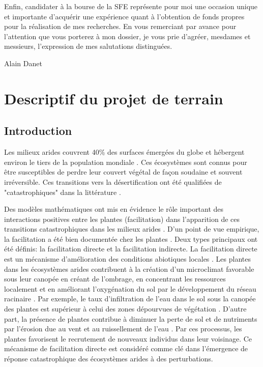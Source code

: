 \documentclass[12pt]{article} %
\begin{document}
Enfin, candidater à la bourse de la SFE représente pour moi une occasion unique et importante d’acquérir une expérience quant à l’obtention de fonds propres pour la réalisation de mes recherches. En vous remerciant par avance pour l’attention que vous porterez à mon dossier, je vous prie d’agréer, mesdames et messieurs, l’expression de mes salutations distinguées.

\begin{flushright}
Alain Danet
\end{flushright}
\clearpage

\section{Descriptif du projet de terrain}

\subsection{Introduction}

Les milieux arides couvrent 40\% des surfaces émergées du globe et hébergent environ le tiers de la population mondiale \citep{Assessment2005}. Ces écosystèmes sont connus pour être susceptibles de perdre leur couvert végétal de façon soudaine et souvent irréversible. Ces transitions vers la désertification ont été qualifiées de "catastrophiques" dans la littérature \citep{Scheffer2001,Kefi2007,Kefi2012a}.

Des modèles mathématiques ont mis en évidence le rôle important des interactions positives entre les plantes (facilitation) dans l'apparition de ces transitions catastrophiques dans les milieux arides \citep{Kefi2007,Kefi2007a,Rietkerk2004}. D'un point de vue empirique, la facilitation a été bien documentée chez les plantes \citep{Callaway1995, Callaway1997}. Deux types principaux ont été définis: la facilitation directe et la facilitation indirecte. La facilitation directe est un mécanisme d'amélioration des conditions abiotiques locales \citep{Kefi2007a}. Les plantes dans les écosystèmes arides contribuent à la création d'un microclimat favorable sous leur canopée en créant de l'ombrage, en concentrant les ressources localement et en améliorant l'oxygénation du sol par le développement du réseau racinaire \citep{Rietkerk1997a}. Par exemple, le taux d'infiltration de l'eau dans le sol sous la canopée des plantes est supérieur à celui des zones dépourvues de végétation \citep{Rietkerk2000}. D'autre part, la présence de plantes contribue à diminuer la perte de sol et de nutriments par l'érosion due au vent et au ruissellement de l'eau \citep{Mayor2008}. Par ces processus, les plantes favorisent le recrutement de nouveaux individus dans leur voisinage. Ce mécanisme de facilitation directe est considéré comme clé dans l'émergence de réponse catastrophique des écosystèmes arides à des perturbations. 
\end{document}

